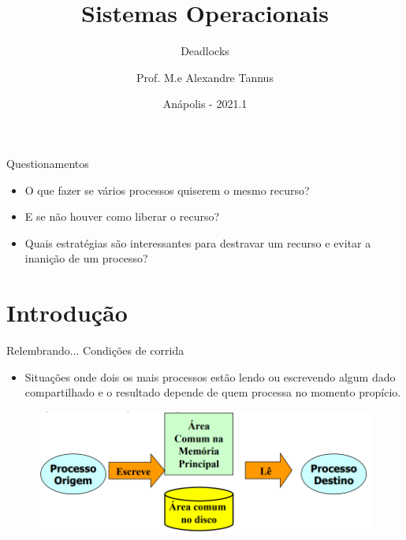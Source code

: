 \documentclass[aspectratio=169,
				xcolor=table]{beamer}
\institute[]{\uppercase{Engenharia de Software}}
\title[]{Sistemas Operacionais}
\subtitle[]{Deadlocks}
\author[]{Prof. M.e Alexandre Tannus}
\date{Anápolis - 2021.1}
\begin{document}
	
	\begin{frame}
		\titlepage
	\end{frame}

	\begin{frame}
		\tableofcontents
	\end{frame}		
	
	\begin{frame}{Questionamentos}
		\begin{itemize}
			
			\item O que fazer se vários processos quiserem o mesmo recurso?
			\vspace{1em}
			\item E se não houver como liberar o recurso?
			\vspace{1em}
			\item Quais estratégias são interessantes para destravar um recurso e evitar a inanição de um processo?
		\end{itemize}
	\end{frame}
	
	\section{Introdução}
	\begin{frame}{Relembrando...}
		\alert{Condições de corrida}
		\begin{itemize}			
			\item Situações onde dois os mais processos estão lendo ou escrevendo algum dado compartilhado e o resultado depende de quem processa no momento propício.
		\end{itemize}
			\vspace{1em}
			\begin{figure}
				\centering
				\includegraphics[keepaspectratio, height=0.5\paperheight]{../figs/cap05/race1.png}			
			\end{figure}

	\end{frame}
\end{document}
